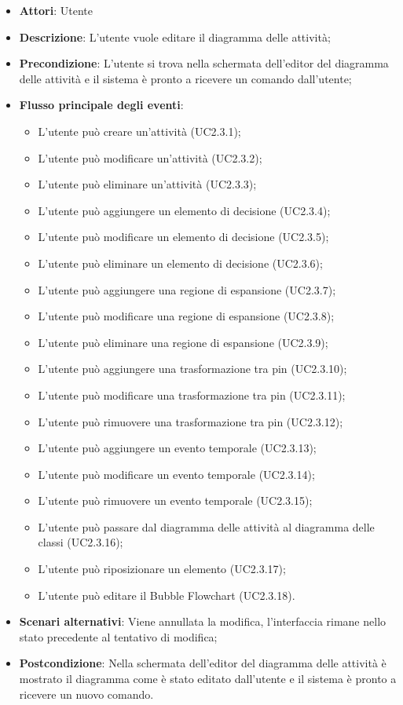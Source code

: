 \documentclass[../AnalisiDeiRequisiti.tex]{subfiles}
\begin{document}
				\begin{itemize}
					\item \textbf{Attori}: Utente
					\item \textbf{Descrizione}: L'utente vuole editare il diagramma delle attività;
					\item \textbf{Precondizione}: L'utente si trova nella schermata dell'editor del diagramma delle attività e il sistema è pronto a ricevere un comando dall'utente;
					\item \textbf{Flusso principale degli eventi}: \begin{itemize}
						\item L'utente può creare un'attività (UC2.3.1);
						\item L'utente può modificare un'attività (UC2.3.2);
						\item L'utente può eliminare un'attività (UC2.3.3);
						\item L'utente può aggiungere un elemento di decisione (UC2.3.4);
						\item L'utente può modificare un elemento di decisione (UC2.3.5);
						\item L'utente può eliminare un elemento di decisione (UC2.3.6);
						\item L'utente può aggiungere una regione di espansione (UC2.3.7);
						\item L'utente può modificare una regione di espansione (UC2.3.8);
						\item L'utente può eliminare una regione di espansione (UC2.3.9);
						\item L'utente può aggiungere una trasformazione tra pin (UC2.3.10);
						\item L'utente può modificare una trasformazione tra pin (UC2.3.11);
						\item L'utente può rimuovere una trasformazione tra pin (UC2.3.12);
						\item L'utente può aggiungere un evento temporale (UC2.3.13);
						\item L'utente può modificare un evento temporale (UC2.3.14);
						\item L'utente può rimuovere un evento temporale (UC2.3.15);
						\item L'utente può passare dal diagramma delle attività al diagramma delle classi (UC2.3.16);
						\item L'utente può riposizionare un elemento (UC2.3.17);
						\item L'utente può editare il Bubble Flowchart (UC2.3.18).
					\end{itemize}
					\item \textbf{Scenari alternativi}: Viene annullata la modifica, l'interfaccia rimane nello stato precedente al tentativo di modifica;
					\item \textbf{Postcondizione}: Nella schermata dell'editor del diagramma delle attività è mostrato il diagramma come è stato editato dall'utente e il sistema è pronto a ricevere un nuovo comando.
				\end{itemize}
\end{document}
